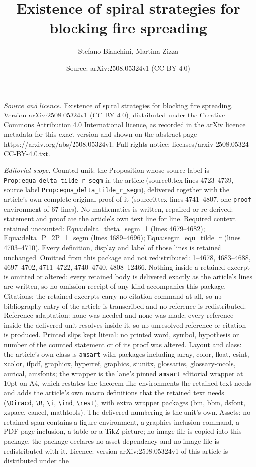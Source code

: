 \documentclass[10pt,a4paper]{amsart}
\title[Existence of spiral strategies for blocking fire spreading]{Existence of spiral strategies for blocking fire spreading}
\author{Stefano Bianchini, Martina Zizza}
\date{Source: arXiv:2508.05324v1 (CC BY 4.0)}
\begin{document}
\maketitle

\noindent\emph{Source and licence.} Existence of spiral strategies for blocking fire spreading. Version arXiv:2508.05324v1 (CC BY 4.0), distributed under the Creative Commons Attribution 4.0 International licence, as recorded in the arXiv licence metadata for this exact version and shown on the abstract page https://arxiv.org/abs/2508.05324v1. Full rights notice: licenses/arxiv-2508.05324-CC-BY-4.0.txt.\par\smallskip

\noindent\textit{Editorial scope.} Counted unit: the Proposition whose source label is \texttt{Prop:equa\_delta\_tilde\_r\_segm} in the article (source0.tex lines 4723--4739, source label \texttt{Prop:equa\_delta\_tilde\_r\_segm}), delivered together with the article's own complete original proof of it (source0.tex lines 4741--4807, one \texttt{proof} environment of 67 lines). No mathematics is written, repaired or re-derived: statement and proof are the article's own text line for line. Required context retained uncounted: Equa:delta\_theta\_segm\_1 (lines 4679--4682); Equa:delta\_P\_2P\_1\_segm (lines 4689--4696); Equa:segm\_equ\_tilde\_r (lines 4703--4710). Every definition, display and label of those lines is retained unchanged. Omitted from this package and not redistributed: 1--4678, 4683--4688, 4697--4702, 4711--4722, 4740--4740, 4808--12466. Nothing inside a retained excerpt is omitted or altered: every retained body is delivered exactly as the article's lines are written, so no omission receipt of any kind accompanies this package. Citations: the retained excerpts carry no citation command at all, so no bibliography entry of the article is transcribed and no reference is redistributed. Reference adaptation: none was needed and none was made; every reference inside the delivered unit resolves inside it, so no unresolved reference or citation is produced. Printed slips kept literal: no printed word, symbol, hypothesis or number of the counted statement or of its proof was altered. Layout and class: the article's own class is \texttt{amsart} with packages including array, color, float, esint, xcolor, ifpdf, graphicx, hyperref, graphics, siunitx, glossaries, glossary-mcols, aurical, amsfonts; the wrapper is the lane's pinned \texttt{amsart} editorial wrapper at 10pt on A4, which restates the theorem-like environments the retained text needs and adds the article's own macro definitions that the retained text needs (\texttt{\textbackslash Diracd}, \texttt{\textbackslash R}, \texttt{\textbackslash i}, \texttt{\textbackslash ind}, \texttt{\textbackslash rest}), with extra wrapper packages (bm, bbm, dsfont, xspace, cancel, mathtools). The delivered numbering is the unit's own. Assets: no retained span contains a figure environment, a graphics-inclusion command, a PDF-page inclusion, a table or a TikZ picture; no image file is copied into this package, the package declares no asset dependency and no image file is redistributed with it. Licence: version arXiv:2508.05324v1 of this article is distributed under the 
\end{document}
